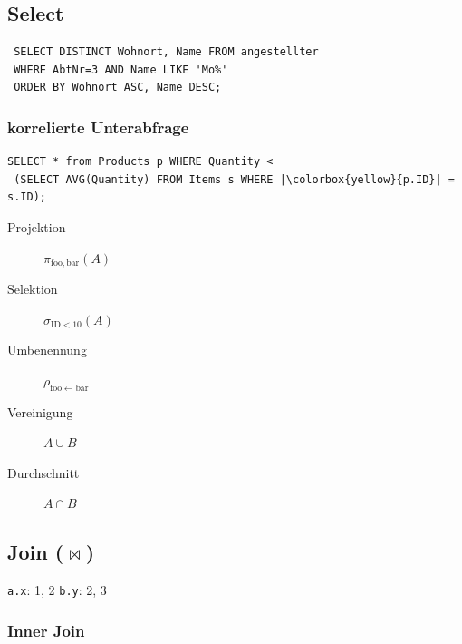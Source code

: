 \begin{multicols*}{3}
\subsection{Select}
\begin{verbatim}
 SELECT DISTINCT Wohnort, Name FROM angestellter
 WHERE AbtNr=3 AND Name LIKE 'Mo%'
 ORDER BY Wohnort ASC, Name DESC;
\end{verbatim}

\subsubsection{korrelierte Unterabfrage}

\begin{verbatim}
SELECT * from Products p WHERE Quantity <
 (SELECT AVG(Quantity) FROM Items s WHERE |\colorbox{yellow}{p.ID}| = s.ID);
\end{verbatim}

\begin{description}
\item[Projektion]{$\pi_{\mathrm{foo, bar}}(A)$ \\
    }
\item[Selektion]{$\sigma_{\mathrm{ID < 10}}(A)$ \\
    }
\item[Umbenennung]{$\rho_{\mathrm{foo} \leftarrow \mathrm{bar}}$ \\
  }
\item[Vereinigung]{$A \cup B$ \\
    }
\item[Durchschnitt]{$A \cap B$ \\
    }
\end{description}

\subsection{Join ($\bowtie$)}

\texttt{a.x}: 1, 2 \hspace{2em} \texttt{b.y}: 2, 3

\subsubsection{Inner Join}


\end{multicols*}
